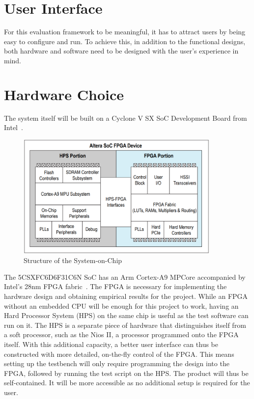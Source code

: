 \section{User Interface}

For this evaluation framework to be meaningful, it has to attract users by being easy to configure and run.
To achieve this, in addition to the functional designs, both hardware and software need to be designed with the user's experience in mind.

\section{Hardware Choice}
The system itself will be built on a Cyclone V SX SoC Development Board from Intel~\cite{Intel1}.

\begin{figure}[H]
  \centering
  \includegraphics[width=10cm]{img/SoCStructure}
  \caption{Structure of the System-on-Chip}
  \label{SoCStructure}
\end{figure}

The 5CSXFC6D6F31C6N SoC has an Arm Cortex-A9 MPCore accompanied by Intel's 28nm FPGA fabric~\cite{Altera1}.
The FPGA is necessary for implementing the hardware design and obtaining empirical results for the project.
While an FPGA without an embedded CPU will be enough for this project to work, having an Hard Processor System (HPS) on the same chip is useful as the test software can run on it.
The HPS is a separate piece of hardware that distinguishes itself from a soft processor, such as the Nios II, a processor programmed onto the FPGA itself.
With this additional capacity, a better user interface can thus be constructed with more detailed, on-the-fly control of the FPGA.
This means setting up the testbench will only require programming the design into the FPGA, followed by running the test script on the HPS.
The product will thus be self-contained.
It will be more accessible as no additional setup is required for the user.

